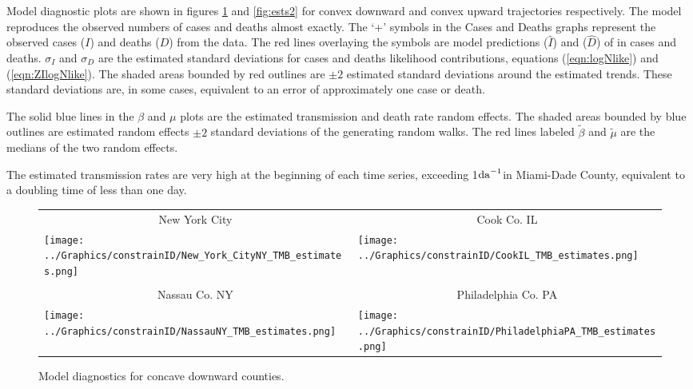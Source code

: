 \documentclass[12pt,letterpaper]{article}
\newcommand\perda{$\rm{da}^{-1}$}
\begin{document}
Model diagnostic plots are shown in figures \ref{fig:ests1} and
\ref{fig:ests2} for convex downward and convex upward trajectories
respectively.
The model reproduces the observed numbers of cases and deaths almost
exactly.
The `+' symbols in the Cases and Deaths graphs represent the observed
cases ($I$) and deaths ($D$) from the data. 
The red lines overlaying the symbols are model predictions ($\widehat{I}$)
and ($\widehat{D}$) of in cases and deaths. 
$\sigma_I$ and $\sigma_D$ are the estimated standard deviations for
cases and deaths likelihood contributions, equations (\ref{eqn:logNlike}) 
and (\ref{eqn:ZIlogNlike}).
The shaded areas bounded by red outlines are 
$\pm 2$ estimated standard deviations around the estimated trends.
These standard deviations are, in some cases, equivalent to an error of approximately
one case or death.

The solid blue lines in the $\beta$ and $\mu$ plots are the estimated
transmission and death rate random effects.
The shaded areas bounded by blue outlines are
estimated random effects $\pm 2$ standard deviations of the generating
random walks.
The red lines labeled $\tilde{\beta}$ and $\tilde{\mu}$ are the
medians of the two random effects.

The estimated transmission rates are very high
at the beginning of each time series, exceeding 1\perda in Miami-Dade
County, equivalent to a doubling time of less than one day.


\begin{figure}
{\scriptsize
\begin{center}
\begin{tabular}{ll}
\multicolumn{1}{c}{New York City}&\multicolumn{1}{c}{Cook Co. IL}\\
\texttt{[image: ../Graphics/constrainID/New\_York\_CityNY\_TMB\_estimates.png]}&
\texttt{[image: ../Graphics/constrainID/CookIL\_TMB\_estimates.png]}\\
\\
\multicolumn{1}{c}{Nassau Co. NY}&\multicolumn{1}{c}{Philadelphia Co.  PA}\\
\texttt{[image: ../Graphics/constrainID/NassauNY\_TMB\_estimates.png]}&
\texttt{[image: ../Graphics/constrainID/PhiladelphiaPA\_TMB\_estimates.png]}\\
\end{tabular}
\end{center}
}
\caption{\label{fig:ests1}
Model diagnostics for concave downward counties.
}
\end{figure}
\end{document}
